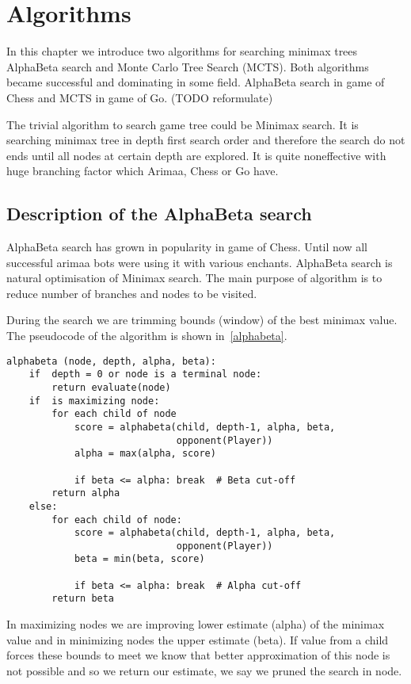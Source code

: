 \chapter{Algorithms}
In this chapter we introduce two algorithms for searching minimax trees
AlphaBeta search and Monte Carlo Tree Search (MCTS). Both algorithms became
successful and dominating in some field. AlphaBeta search in game of Chess and
MCTS in game of Go. (TODO reformulate)

The trivial algorithm to search game tree could be Minimax search. It is
searching minimax tree in depth first search order and therefore the search do
not ends until all nodes at certain depth are explored. It is quite
noneffective with huge branching factor which Arimaa, Chess or Go have.

\section{Description of the AlphaBeta search}
AlphaBeta search has grown in popularity in game of Chess. Until now all
successful arimaa bots were using it with various enchants. AlphaBeta search is
natural optimisation of Minimax search. The main purpose of algorithm is to
reduce number of branches and nodes to be visited.

During the search we are trimming bounds (window) of the best minimax value.
The pseudocode of the algorithm is shown in~\ref{alphabeta}.

\lstset{language=Python, caption=Pseudocode of the AlphaBeta search, label=alphabeta}
\begin{lstlisting}
alphabeta (node, depth, alpha, beta):
    if  depth = 0 or node is a terminal node:
        return evaluate(node)
    if  is maximizing node:
        for each child of node
            score = alphabeta(child, depth-1, alpha, beta,
                              opponent(Player))
            alpha = max(alpha, score)

            if beta <= alpha: break  # Beta cut-off
        return alpha
    else:
        for each child of node:
            score = alphabeta(child, depth-1, alpha, beta,
                              opponent(Player))
            beta = min(beta, score)

            if beta <= alpha: break  # Alpha cut-off
        return beta
\end{lstlisting}

In maximizing nodes we are improving lower estimate (alpha) of the minimax
value and in minimizing nodes the upper estimate (beta). If value from a child
forces these bounds to meet we know that better approximation of this node is
not possible and so we return our estimate, we say we pruned the search in
node.

